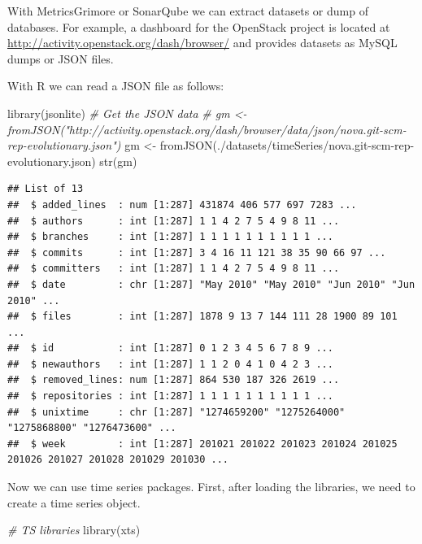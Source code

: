 \documentclass[
]{book}
\newenvironment{Shaded}{\begin{snugshade}}{\end{snugshade}}
\newcommand{\CommentTok}[1]{\textcolor[rgb]{0.56,0.35,0.01}{\textit{#1}}}
\newcommand{\FunctionTok}[1]{\textcolor[rgb]{0.00,0.00,0.00}{#1}}
\newcommand{\NormalTok}[1]{#1}
\newcommand{\OtherTok}[1]{\textcolor[rgb]{0.56,0.35,0.01}{#1}}
\newcommand{\StringTok}[1]{\textcolor[rgb]{0.31,0.60,0.02}{#1}}
\begin{document}
With MetricsGrimore or SonarQube we can extract datasets or dump of databases. For example, a dashboard for the OpenStack project is located at \url{http://activity.openstack.org/dash/browser/} and provides datasets as MySQL dumps or JSON files.

With R we can read a JSON file as follows:

\begin{Shaded}
\begin{Highlighting}[]
\FunctionTok{library}\NormalTok{(jsonlite)}
\CommentTok{\# Get the JSON data }
\CommentTok{\# gm \textless{}{-} fromJSON("http://activity.openstack.org/dash/browser/data/json/nova.git{-}scm{-}rep{-}evolutionary.json")}
\NormalTok{gm }\OtherTok{\textless{}{-}} \FunctionTok{fromJSON}\NormalTok{(}\StringTok{\textquotesingle{}./datasets/timeSeries/nova.git{-}scm{-}rep{-}evolutionary.json\textquotesingle{}}\NormalTok{)}
\FunctionTok{str}\NormalTok{(gm)}
\end{Highlighting}
\end{Shaded}

\begin{verbatim}
## List of 13
##  $ added_lines  : num [1:287] 431874 406 577 697 7283 ...
##  $ authors      : int [1:287] 1 1 4 2 7 5 4 9 8 11 ...
##  $ branches     : int [1:287] 1 1 1 1 1 1 1 1 1 1 ...
##  $ commits      : int [1:287] 3 4 16 11 121 38 35 90 66 97 ...
##  $ committers   : int [1:287] 1 1 4 2 7 5 4 9 8 11 ...
##  $ date         : chr [1:287] "May 2010" "May 2010" "Jun 2010" "Jun 2010" ...
##  $ files        : int [1:287] 1878 9 13 7 144 111 28 1900 89 101 ...
##  $ id           : int [1:287] 0 1 2 3 4 5 6 7 8 9 ...
##  $ newauthors   : int [1:287] 1 1 2 0 4 1 0 4 2 3 ...
##  $ removed_lines: num [1:287] 864 530 187 326 2619 ...
##  $ repositories : int [1:287] 1 1 1 1 1 1 1 1 1 1 ...
##  $ unixtime     : chr [1:287] "1274659200" "1275264000" "1275868800" "1276473600" ...
##  $ week         : int [1:287] 201021 201022 201023 201024 201025 201026 201027 201028 201029 201030 ...
\end{verbatim}

Now we can use time series packages. First, after loading the libraries, we need to create a time series object.

\begin{Shaded}
\begin{Highlighting}[]
\CommentTok{\# TS libraries}
\FunctionTok{library}\NormalTok{(xts)}
\end{Highlighting}
\end{Shaded}
\end{document}
